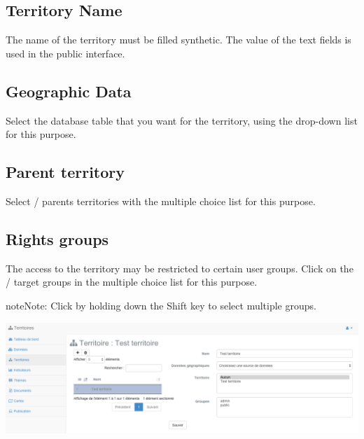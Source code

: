 \documentclass[letterpaper,10pt,english]{sphinxmanual}
\begin{document}


\subsection{Territory Name}
\label{territories/infopanel:nom-du-territoire}
The name of the territory must be filled synthetic. The value of the text fields is used in the public interface.


\subsection{Geographic Data}
\label{territories/infopanel:donnee-geographique}
Select the database table that you want for the territory, using the drop-down list for this purpose.


\subsection{Parent territory}
\label{territories/infopanel:territoire-parent}
Select / parents territories with the multiple choice list for this purpose.


\subsection{Rights groups}
\label{territories/infopanel:droits-des-groupes}
The access to the territory may be restricted to certain user groups. Click on the / target groups in the multiple choice list for this purpose.

\begin{notice}{note}{Note:}
Click by holding down the Shift key to select multiple groups.
\end{notice}

\includegraphics[width=1.000\linewidth]{territory-module-preview.png}
\end{document}

